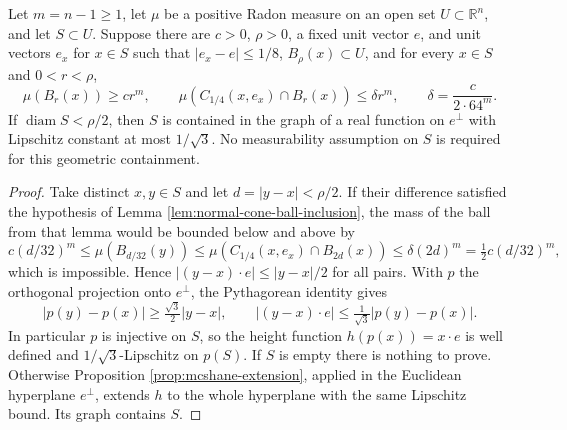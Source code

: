 \begin{proposition}\label{prop:uniform-cone-lipschitz-graph}
Let $m=n-1\geq1$, let $\mu$ be a positive Radon measure on an open set $U\subset\mathbb R^n$, and let $S\subset U$. Suppose there are $c>0$, $\rho>0$, a fixed unit vector $e$, and unit vectors $e_x$ for $x\in S$ such that $|e_x-e|\leq1/8$, $B_\rho(x)\subset U$, and for every $x\in S$ and $0<r<\rho$,
\[
 \mu(B_r(x))\geq c r^m,
 \qquad \mu(C_{1/4}(x,e_x)\cap B_r(x))\leq\delta r^m,
 \qquad \delta=\frac{c}{2\cdot64^m}.
\]
If $\operatorname{diam}S<\rho/2$, then $S$ is contained in the graph of a real function on $e^\perp$ with Lipschitz constant at most $1/\sqrt3$. No measurability assumption on $S$ is required for this geometric containment.
\end{proposition}
\begin{proof}
Take distinct $x,y\in S$ and let $d=|y-x|<\rho/2$. If their difference satisfied the hypothesis of Lemma \ref{lem:normal-cone-ball-inclusion}, the mass of the ball from that lemma would be bounded below and above by
\[
 c(d/32)^m
 \leq\mu(B_{d/32}(y))
 \leq\mu(C_{1/4}(x,e_x)\cap B_{2d}(x))
 \leq\delta(2d)^m=\tfrac12c(d/32)^m,
\]
which is impossible. Hence $|(y-x)\cdot e|\leq|y-x|/2$ for all pairs. With $p$ the orthogonal projection onto $e^\perp$, the Pythagorean identity gives
\[
 |p(y)-p(x)|\geq\tfrac{\sqrt3}{2}|y-x|,
 \qquad |(y-x)\cdot e|\leq\tfrac1{\sqrt3}|p(y)-p(x)|.
\]
In particular $p$ is injective on $S$, so the height function $h(p(x))=x\cdot e$ is well defined and $1/\sqrt3$-Lipschitz on $p(S)$. If $S$ is empty there is nothing to prove. Otherwise Proposition \ref{prop:mcshane-extension}, applied in the Euclidean hyperplane $e^\perp$, extends $h$ to the whole hyperplane with the same Lipschitz bound. Its graph contains $S$.
\end{proof}

